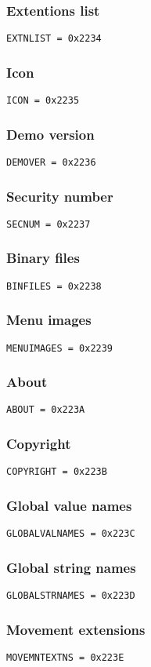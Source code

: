 \documentclass{article}
\begin{document}
\subsubsection{Extentions list}
\verb|EXTNLIST = 0x2234|

\subsubsection{Icon}
\verb|ICON = 0x2235|

\subsubsection{Demo version}
\verb|DEMOVER = 0x2236|

\subsubsection{Security number}
\verb|SECNUM = 0x2237|

\subsubsection{Binary files}
\verb|BINFILES = 0x2238|

\subsubsection{Menu images}
\verb|MENUIMAGES = 0x2239|

\subsubsection{About}
\verb|ABOUT = 0x223A|

\subsubsection{Copyright}
\verb|COPYRIGHT = 0x223B|

\subsubsection{Global value names}
\verb|GLOBALVALNAMES = 0x223C|

\subsubsection{Global string names}
\verb|GLOBALSTRNAMES = 0x223D|

\subsubsection{Movement extensions}
\verb|MOVEMNTEXTNS = 0x223E|
\end{document}
